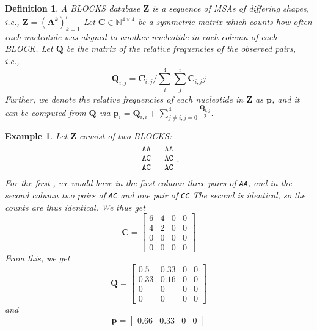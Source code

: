 \documentclass{article}
\newtheorem{definition}{Definition}
\newtheorem{example}{Example}
\begin{document}
\begin{definition}
A BLOCKS database $\mathbf Z$ is a sequence of MSAs of differing shapes, i.e., $\mathbf Z = (\mathbf A^k)_{k=1}^l$
	Let $\mathbf C \in \mathbb N^{4 \times 4}$ be a symmetric matrix
which counts how often each nucleotide was aligned to another nucleotide in each column of each BLOCK.
Let $\mathbf Q$ be the matrix of the relative frequencies of the observed pairs, i.e.,
\begin{equation*}
	 \mathbf Q_{i, j} = \mathbf C_{i, j} / \sum_i^4 \sum_j^i \mathbf C_{i, j}j
\end{equation*}
Further, we denote the relative frequencies of each nucleotide in $\mathbf Z$ as $\mathbf p$, and it can
be computed from $\mathbf Q$ via $\mathbf p_i = \mathbf Q_{i, i} + \sum_{j \ne i, j = 0}^4 \frac {\mathbf Q_{i, j}} {2}$.
\end{definition}
\begin{example}
	Let $\mathbf Z$ consist of two BLOCKS:
	\begin{equation*}
		\begin{matrix}
		\begin{matrix}
			\texttt{AA} \\
			\texttt{AC} \\
			\texttt{AC} \\
		\end{matrix} &
		\begin{matrix}
			\texttt{AA} \\
			\texttt{AC} \\
			\texttt{AC} \\
		\end{matrix}.
	\end{matrix}
	\end{equation*}
	For the first , we would have in the first column three pairs of \texttt{AA}, and in the second column two pairs of \texttt{AC} and one pair of \texttt{CC}
	The second  is identical, so the counts are thus identical. We thus get
	\begin{equation*}
		\mathbf C = \begin{bmatrix}
			6 & 4 & 0 & 0 \\
			4 & 2 & 0 & 0 \\
			0 & 0 & 0 & 0 \\
			0 & 0 & 0 & 0
		\end{bmatrix}
	\end{equation*}
	From this, we get
	\begin{equation*}
		\mathbf Q = \begin{bmatrix}
			0.5 & 0.33 & 0 & 0 \\
			0.33 & 0.16 & 0 & 0 \\
			0 & 0 & 0 & 0 \\
			0 & 0 & 0 & 0
		\end{bmatrix}
	\end{equation*}
	and
	\begin{equation*}
		\mathbf p = \begin{bmatrix}
			0.66 & 0.33 & 0 & 0
		\end{bmatrix}
	\end{equation*}
\end{example}
\end{document}
